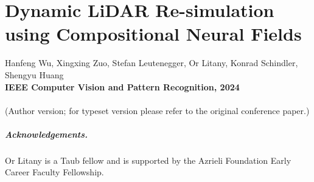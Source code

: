 \chapter[Dynamic LiDAR Re-simulation using Compositional Neural Fields]{Dynamic LiDAR Re-simulation using Compositional Neural Fields}
\label{chap:cvpr24}

Hanfeng Wu, Xingxing Zuo, Stefan Leutenegger, Or Litany, Konrad Schindler, Shengyu Huang \\
\textbf{IEEE Computer Vision and Pattern Recognition, 2024}\\
\\
(Author version; for typeset version please refer to the original conference paper.)\\

\providecommand{\subdir}{.}
\graphicspath{{\subdir/}}











\paragraph{Acknowledgements.}
{Or Litany is a Taub fellow and is supported by the Azrieli Foundation Early Career Faculty Fellowship.}